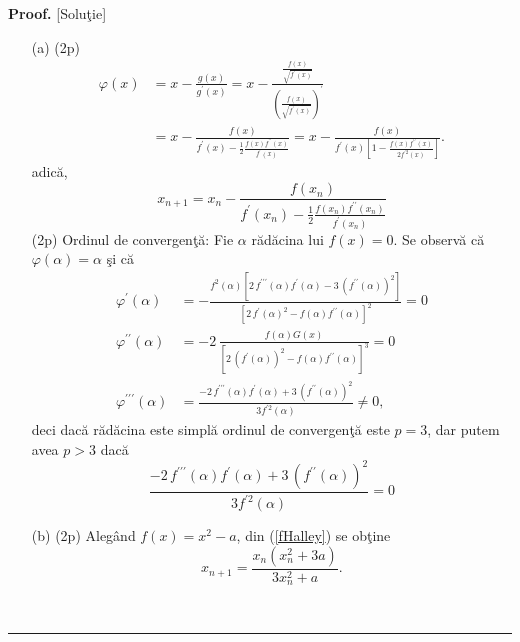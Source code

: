 \documentclass{article}%
\newenvironment{proof}[1][Proof]{\noindent\textbf{#1.} }{\ \rule{0.5em}{0.5em}}
\begin{document}
\begin{proof}
[Solu\c{t}ie]

\begin{enumerate}
\item[(a)] (2p)%
\begin{align*}
\varphi(x) &  =x-\frac{g(x)}{g^{\prime}(x)}=x-\frac{\frac{f(x)}{\sqrt
{f^{\prime}(x)}}}{\left(  \frac{f(x)}{\sqrt{f^{\prime}(x)}}\right)  ^{\prime}%
}\\
&  =x-\frac{f(x)}{f^{\prime}(x)-\frac{1}{2}\frac{f(x)f^{\prime\prime}%
(x)}{f^{\prime}(x)}}=x-\frac{f(x)}{f^{\prime}(x)\left[  1-\frac{f(x)f^{\prime
\prime}(x)}{2f^{\prime2}(x)}\right]  }.
\end{align*}
adic\u{a},%
\begin{equation}
x_{n+1}=x_{n}-\frac{f(x_{n})}{f^{\prime}(x_{n})-\frac{1}{2}\frac
{f(x_{n})f^{\prime\prime}(x_{n})}{f^{\prime}(x_{n})}}\label{fHalley}%
\end{equation}
(2p) Ordinul de convergen\c{t}\u{a}: Fie $\alpha$ r\u{a}d\u{a}cina lui
$f(x)=0$. Se observ\u{a} c\u{a} $\varphi(\alpha)=\alpha$ \c{s}i c\u{a}
\begin{align*}
\varphi^{\prime}(\alpha) &  =-{\frac{f^{2}\left(  \alpha\right)  \left[
2\,f^{\prime\prime\prime}\left(  \alpha\right)  f^{\prime}\left(
\alpha\right)  -3\,\left(  f^{\prime\prime}\left(  \alpha\right)  \right)
^{2}\right]  }{\left[  2\,f^{\prime}\left(  \alpha\right)  ^{2}-f\left(
\alpha\right)  f^{\prime\prime}\left(  \alpha\right)  \right]  ^{2}}=0}\\
\varphi^{\prime\prime}(\alpha) &  =-2\,{\frac{f\left(  \alpha\right)
G(x)}{\left[  2\,\left(  f^{\prime}\left(  \alpha\right)  \right)
^{2}-f\left(  \alpha\right)  f^{\prime\prime}\left(  \alpha\right)  \right]
^{3}}=0}\\
\varphi^{\prime\prime\prime}(\alpha) &  ={\frac{-2\,f^{\prime\prime\prime
}\left(  \alpha\right)  f^{\prime}\left(  \alpha\right)  +3\,\left(
f^{\prime\prime}\left(  \alpha\right)  \right)  ^{2}}{3f^{\prime2}\left(
\alpha\right)  }\neq0,}%
\end{align*}
deci dac\u{a} r\u{a}d\u{a}cina este simpl\u{a} ordinul de convergen\c{t}\u{a}
este $p=3$, dar putem avea $p>3$ dac\u{a}%
\[
{\frac{-2\,f^{\prime\prime\prime}\left(  \alpha\right)  f^{\prime}\left(
\alpha\right)  +3\,\left(  f^{\prime\prime}\left(  \alpha\right)  \right)
^{2}}{3f^{\prime2}\left(  \alpha\right)  }}=0
\]


\item[(b)] (2p) Aleg\^{a}nd $f(x)=x^{2}-a$, din (\ref{fHalley}) se ob\c{t}ine%
\[
x_{n+1}=\frac{x_{n}\left(  x_{n}^{2}+3a\right)  }{3x_{n}^{2}+a}.
\]

\end{enumerate}
\end{proof}
\end{document}
